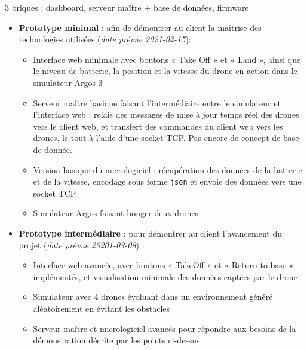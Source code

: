 \documentclass{mistcoursedoc}
\begin{document}
3 briques : dashboard, serveur maître + base de données, firmware
\begin{itemize}
  \item \textbf{Prototype minimal} : afin de démontrer au client la maîtrise des technologies utilisées (\textit{date prévue 2021-02-15}):
        \begin{itemize}
          \item Interface web minimale avec boutons « Take Off » et « Land », ainsi que le niveau de batterie, la position et la vitesse du drone en action dans le simulateur Argos 3
          \item Serveur maître basique faisant l'intermédiaire entre le simulateur et l'interface web : relais des messages de mise à jour temps réel des drones vers le client web, et transfert des commandes du client web vers les drones, le tout à l'aide d'une socket TCP. Pas encore de concept de base de donnée.
          \item Version basique du micrologiciel : récupération des données de la batterie et de la vitesse, encodage sous forme \texttt{json} et envoie des données vers une socket TCP
          \item Simulateur Argos faisant bouger deux drones
        \end{itemize}
  \item \textbf{Prototype intermédiaire} : pour démontrer au client l'avancement du projet (\textit{date prévue 20201-03-08}) :
      \begin{itemize}
        \item Interface web avancée, avec boutons « TakeOff » et « Return to base » implémentés, et visualisation minimale des données captées par le drone
        \item Simulateur avec 4 drones évoluant dans un environnement généré aléatoirement en évitant les obstacles
        \item Serveur maître et micrologiciel avancés pour répondre aux besoins de la démonstration décrite par les points ci-dessus
      \end{itemize}

\end{itemize}
\end{document}
